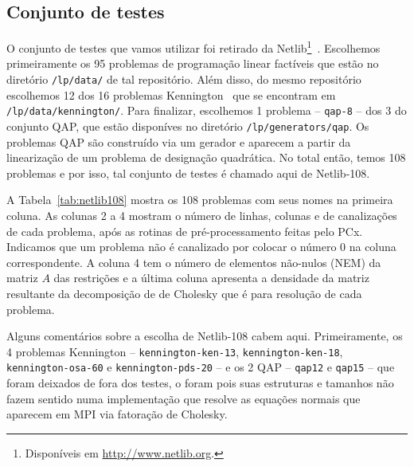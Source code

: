 


\subsection{Conjunto de testes}

O conjunto de testes que vamos utilizar foi retirado da Netlib\footnote{Disponíveis em \url{http://www.netlib.org}.}~\cite{Dongarra:1987jk}. Escolhemos primeiramente os \num{95} problemas de programação linear factíveis que estão no diretório \verb|/lp/data/| de tal repositório.  Além disso, do mesmo repositório escolhemos \num{12} dos \num{16} problemas Kennington~\cite{Kennington:1990vo} que se encontram em \verb|/lp/data/kennington/|. Para finalizar, escolhemos 1 problema -- \texttt{qap-8} -- dos \num{3} do conjunto  QAP, que estão disponíves no diretório \verb|/lp/generators/qap|. Os problemas QAP são  construído via um gerador  e  aparecem a partir da linearização de um problema  de designação quadrática. No total então, temos 108 problemas e por isso, tal conjunto de testes é chamado aqui de Netlib-108. 


A Tabela~\ref{tab:netlib108} mostra os \num{108} problemas com seus nomes na primeira coluna. As colunas 2 a 4 mostram o número de linhas, colunas e de canalizações de cada problema, após as rotinas de pré-processamento feitas pelo PCx. Indicamos que um problema  não é canalizado por colocar o número \num{0} na coluna correspondente. A coluna 4 tem o número de elementos não-nulos (NEM) da matriz $A$ das restrições e a última coluna apresenta a densidade da matriz resultante da decomposição de de Cholesky que é para resolução de cada problema.


Alguns comentários sobre a escolha de Netlib-108 cabem aqui. Primeiramente, os \num{4} problemas  Kennington -- \texttt{kennington-ken-13}, \texttt{kennington-ken-18}, \texttt{ken\-ning\-ton-osa-60} e \texttt{ken\-ning\-ton-pds-20} --  e os \num{2} QAP -- \texttt{qap12} e \texttt{qap15} --  que foram deixados de fora dos testes, o foram pois suas estruturas e tamanhos não fazem sentido numa implementação que resolve as equações normais que aparecem em \ac{MPI} via fatoração de Cholesky. 

